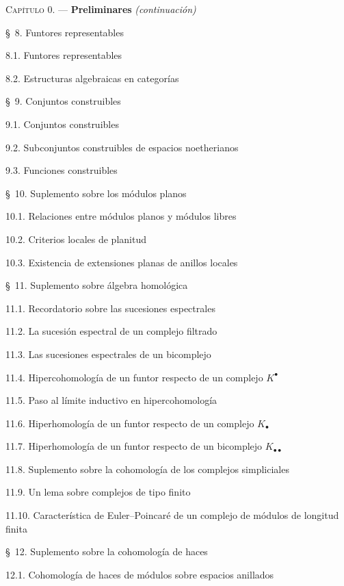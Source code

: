 \documentclass[10pt,oneside,openany]{book}
\theoremstyle{egaenv}\newtheorem*{env}{---}
\theoremstyle{egastatement}
\theoremstyle{egadescription}
\begin{document}
\begin{flushleft}
\textsc{Capítulo 0.} --- \textbf{Preliminares} \textit{(continuación)} 

\medskip
\S~8. Funtores representables 

8.1. Funtores representables 

8.2. Estructuras algebraicas en categorías 

\medskip
\S~9. Conjuntos construibles 

9.1. Conjuntos construibles 

9.2. Subconjuntos construibles de espacios noetherianos 

9.3. Funciones construibles 

\medskip
\S~10. Suplemento sobre los módulos planos 

10.1. Relaciones entre módulos planos y módulos libres 

10.2. Criterios locales de planitud 

10.3. Existencia de extensiones planas de anillos locales 

\medskip
\S~11. Suplemento sobre álgebra homológica 

11.1. Recordatorio sobre las sucesiones espectrales 

11.2. La sucesión espectral de un complejo filtrado 

11.3. Las sucesiones espectrales de un bicomplejo 

11.4. Hipercohomología de un funtor respecto de un complejo $K^\bullet$

11.5. Paso al límite inductivo en hipercohomología 

11.6. Hiperhomología de un funtor respecto de un complejo $K_\bullet$

11.7. Hiperhomología de un funtor respecto de un bicomplejo
$K_{\bullet\bullet}$ 

11.8. Suplemento sobre la cohomología de los complejos simpliciales 

11.9. Un lema sobre complejos de tipo finito 

11.10. Característica de Euler--Poincaré de un complejo de módulos de longitud finita

\medskip
\S~12. Suplemento sobre la cohomología de haces 

12.1. Cohomología de haces de módulos sobre espacios anillados 


\end{flushleft}
\end{document}
